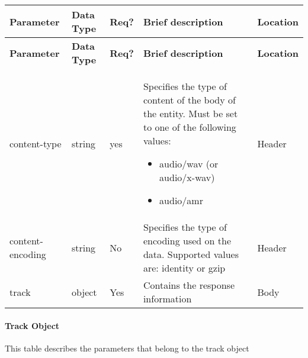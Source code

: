 {\footnotesize{}}%
\begin{longtable}{|>{\raggedright}p{}|>{\raggedright}p{}|>{\raggedright}p{}|>{\raggedright}p{}|>{\raggedright}p{}|}
\hline
\hline 
\textbf{\footnotesize{Parameter }} & \textbf{\footnotesize{Data Type}} & \textbf{\footnotesize{Req?}} & \textbf{\footnotesize{Brief description}} & \textbf{\footnotesize{Location}}\tabularnewline
\hline 
\hline
\endfirsthead
\hline
\hline 
\textbf{\footnotesize{Parameter }} & \textbf{\footnotesize{Data Type}} & \textbf{\footnotesize{Req?}} & \textbf{\footnotesize{Brief description}} & \textbf{\footnotesize{Location}}\tabularnewline
\hline 
\hline
\endhead
\hline 
{\footnotesize{content-type}} & {\footnotesize{string}} & {\footnotesize{yes}} & {\footnotesize{Specifies the type of content of the body of the entity.
Must be set to one of the following values:}}{\footnotesize \par}
\begin{itemize}
\item {\footnotesize{audio/wav (or audio/x-wav)}}{\footnotesize \par}
\item {\footnotesize{audio/amr}}\end{itemize}
 & {\footnotesize{Header}}\tabularnewline
\hline 
{\footnotesize{content-encoding}} & {\footnotesize{string}} & {\footnotesize{No }} & {\footnotesize{Specifies the type of encoding used on the data. Supported
values are: identity or gzip}} & {\footnotesize{Header}}\tabularnewline
\hline 
{\footnotesize{track}} & {\footnotesize{object }} & {\footnotesize{Yes}} & {\footnotesize{Contains the response information}} & {\footnotesize{Body}}\tabularnewline
\hline 
\end{longtable}{\footnotesize \par}


\paragraph*{Track Object}

This table describes the parameters that belong to the track object

